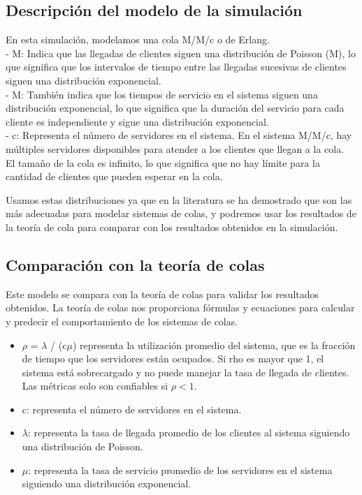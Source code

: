 \documentclass[11pt]{article}
\begin{document}
    \subsection{Descripción del modelo de la simulación}
    En esta simulación, modelamos una cola M/M/c o de Erlang. \\
- M: Indica que las llegadas de clientes siguen una distribución de Poisson (M), lo que significa que los intervalos de tiempo entre las llegadas sucesivas de clientes siguen una distribución exponencial.\\
- M: También indica que los tiempos de servicio en el sistema siguen una distribución exponencial, lo que significa que la duración del servicio para cada cliente es independiente y sigue una distribución exponencial.\\
- c: Representa el número de servidores en el sistema. En el sistema M/M/c, hay múltiples servidores disponibles para atender a los clientes que llegan a la cola.\\
El tamaño de la cola es infinito, lo que significa que no hay límite para la cantidad de clientes que pueden esperar en la cola.

Usamos estas distribuciones ya que en la literatura se ha demostrado que son las más adecuadas para modelar sistemas de colas, y podremos usar los resultados de la teoría de cola para comparar con los resultados obtenidos en la simulación.

    \subsection{Comparación con la teoría de colas}
    Este modelo se compara con la teoría de colas para validar los resultados obtenidos. La
    teoría de colas nos proporciona fórmulas y ecuaciones para calcular y predecir el comportamiento de los sistemas de colas.


    \begin{itemize}
        \item $\rho$ = $\lambda$ / (c$\mu$) representa la utilización promedio del sistema, que es la fracción de tiempo que los servidores están ocupados. Si rho es mayor que 1, el sistema está sobrecargado y no puede manejar la tasa de llegada de clientes. Las métricas solo son confiables si $\rho < 1$.
        \item c: representa el número de servidores en el sistema.
        \item $\lambda$: representa la tasa de llegada promedio de los clientes al sistema siguiendo una distribución de Poisson.
        \item $\mu$: representa la tasa de servicio promedio de los servidores en el sistema siguiendo una distribución exponencial.
    \end{itemize}
\end{document}
